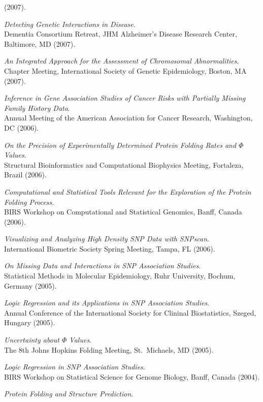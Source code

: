 \documentclass[10pt]{article}
\newcommand{\dn}[1]{{\color{black} {#1}}}
\begin{document}
(2007).
\item
{\it Detecting Genetic Interactions in Disease}.\\
Dementia Consortium Retreat, JHM Alzheimer's Disease Research Center, \dn{Baltimore, MD}
(2007).
\item
{\it An Integrated Approach for the Assessment of Chromosomal Abnormalities}.\\
Chapter Meeting, International Society of Genetic Epidemiology, \dn{Boston, MA}
(2007).
\item
{\it Inference in Gene Association Studies of Cancer Risks with Partially Missing Family History Data}.\\
Annual Meeting of the American Association for Cancer Research, Washington, DC
(2006).
\item
{\it On the Precision of Experimentally Determined Protein Folding Rates and $\Phi$ Values}.\\
Structural Bioinformatics and Computational Biophysics Meeting, \dn{Fortaleza, Brazil}
(2006).
\item
{\it Computational and Statistical Tools Relevant for the Exploration of the Protein Folding Process}.\\
BIRS Workshop on Computational and Statistical Genomics, \dn{Banff, Canada}
(2006).
\item
{\it Visualizing and Analyzing High Density SNP Data with SNPscan}.\\
International Biometric Society Spring Meeting, \dn{Tampa, FL}
(2006).
\item
{\it On Missing Data and Interactions in SNP Association Studies}.\\
Statistical Methods in Molecular Epidemiology, Ruhr University, \dn{Bochum, Germany}
(2005).
\item
{\it Logic Regression and its Applications in SNP Association Studies}.\\
Annual Conference of the International Society for Clininal Biostatistics, \dn{Szeged, Hungary}
(2005).
\item
{\it Uncertainty about $\Phi$ Values}.\\
The 8th Johns Hopkins Folding Meeting, St.~Michaels, MD
(2005).
\item
{\it Logic Regression in SNP Association Studies}.\\
BIRS Workshop on Statistical Science for Genome Biology, \dn{Banff, Canada}
(2004).
\item
{\it Protein Folding and Structure Prediction}.\\
\end{document}
